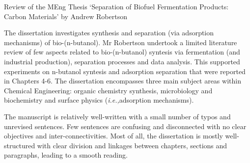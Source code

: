 \documentclass[14pt,twoside]{report}
\newcommand{\ie}{{\it i.e.,}}
\begin{document}

\bigskip

\begin{center}
  {\Large Review of the MEng Thesis `Separation of Biofuel Fermentation Products: Carbon Materials' by Andrew Robertson}
\end{center}
    
The dissertation investigates synthesis and separation (via adsorption mechanisms) of bio-(n-butanol). Mr Robertson undertook a limited literature review of few aspects related to bio-(n-butanol) syntesis via fermentation (and industrial production), separation processes and data analysis. This supported experiments on n-butanol syntesis and adsorption separation that were reported in Chapters 4-6. The dissertation encompasses three main subject areas within Chemical Engineering: organic chemistry synthesis, microbiology and biochemistry and surface physics (\ie adsorption mechanisms).

The manuscript is relatively well-written with a small number of typos and unrevised sentences. Few sentences are confusing and disconnected with no clear objectives and inter-connectivities. Most of all, the dissertation is mostly well-structured with clear division and linkages between chapters, sections and paragraphs, leading to a smooth reading.
\end{document}
